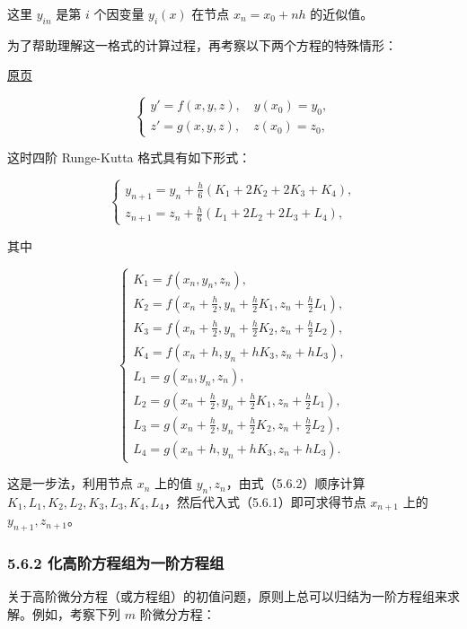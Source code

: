 \documentclass[
  10pt,
  fontset=fandol]{ctexart}
\begin{document}
这里 \(y_{in}\) 是第 \(i\) 个因变量 \(y_i(x)\) 在节点 \(x_n=x_0+nh\) 的近似值。

为了帮助理解这一格式的计算过程，再考察以下两个方程的特殊情形：

\href{../../source-images/pdf-146.jpeg}{原页}

\[
\begin{cases}
y'=f(x,y,z),\quad y(x_0)=y_0,\\
z'=g(x,y,z),\quad z(x_0)=z_0,
\end{cases}
\]

这时四阶 Runge-Kutta 格式具有如下形式：

\[
\begin{cases}
\displaystyle y_{n+1}=y_n+\frac h6(K_1+2K_2+2K_3+K_4),\\[6pt]
\displaystyle z_{n+1}=z_n+\frac h6(L_1+2L_2+2L_3+L_4),
\end{cases}
\tag{5.6.1}
\]

其中

\[
\begin{cases}
K_1=f(x_n,y_n,z_n),\\
\displaystyle K_2=f\left(x_n+\frac h2,y_n+\frac h2K_1,z_n+\frac h2L_1\right),\\[4pt]
\displaystyle K_3=f\left(x_n+\frac h2,y_n+\frac h2K_2,z_n+\frac h2L_2\right),\\[4pt]
K_4=f(x_n+h,y_n+hK_3,z_n+hL_3),\\
L_1=g(x_n,y_n,z_n),\\
\displaystyle L_2=g\left(x_n+\frac h2,y_n+\frac h2K_1,z_n+\frac h2L_1\right),\\[4pt]
\displaystyle L_3=g\left(x_n+\frac h2,y_n+\frac h2K_2,z_n+\frac h2L_2\right),\\[4pt]
L_4=g(x_n+h,y_n+hK_3,z_n+hL_3).
\end{cases}
\tag{5.6.2}
\]

这是一步法，利用节点 \(x_n\) 上的值 \(y_n,z_n\)，由式（5.6.2）顺序计算 \(K_1,\allowbreak L_1,\allowbreak K_2,\allowbreak L_2,\allowbreak K_3,\allowbreak L_3,\allowbreak K_4,\allowbreak L_4\)，然后代入式（5.6.1）即可求得节点 \(x_{n+1}\) 上的 \(y_{n+1},z_{n+1}\)。

\subsubsection{5.6.2 化高阶方程组为一阶方程组}\label{ux5316ux9ad8ux9636ux65b9ux7a0bux7ec4ux4e3aux4e00ux9636ux65b9ux7a0bux7ec4}

关于高阶微分方程（或方程组）的初值问题，原则上总可以归结为一阶方程组来求解。例如，考察下列 \(m\) 阶微分方程：
\end{document}
